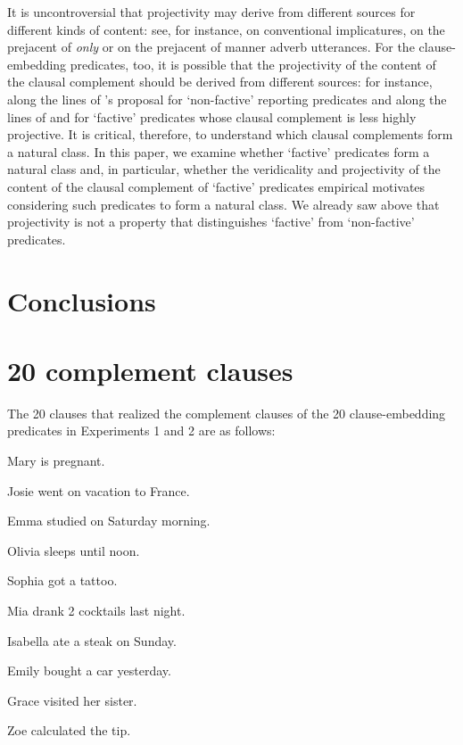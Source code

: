 \documentclass[11pt,fleqn]{article}
\newcommand{\6}{\mbox{$[\hspace*{-.6mm}[$}}
\newcommand{\9}{\mbox{$]\hspace*{-.6mm}]$}}
\newcommand{\citepos}[1]{\citeauthor{#1}'s \citeyear{#1}}
\begin{document}
{\begin{itemize}
It is uncontroversial that projectivity may derive from different sources for different kinds of content: see, for instance, \citealt{potts05} on conventional implicatures, \citealt{beaver-clark08} on the prejacent of {\em only} or \citealt{abrusan2013} on the prejacent of manner adverb utterances.  For the clause-embedding predicates, too, it is possible that the projectivity of the content of the clausal complement should be derived from different sources: for instance, along the lines of \citepos{anand-hacquard2014} proposal for `non-factive' reporting predicates and along the lines of \citealt{abusch10,abrusan2011} and \citealt{romoli2015} for `factive' predicates whose clausal complement is less highly projective. It is critical, therefore, to understand which clausal complements form a natural class. In this paper, we examine whether `factive' predicates form a natural class and, in particular, whether the veridicality and projectivity of the content of the clausal complement of `factive' predicates empirical motivates considering such predicates to form a natural class. We already saw above that projectivity is not a property that distinguishes `factive' from `non-factive' predicates. 

\end{itemize}

\section{Conclusions}\label{s5}

\appendix

\setcounter{table}{0}
\renewcommand{\thetable}{A\arabic{table}}

\setcounter{figure}{0}
\renewcommand{\thefigure}{A\arabic{figure}}

\section{20 complement clauses}\label{a-clauses}

The 20  clauses that realized the complement clauses of the 20 clause-embedding predicates in Experiments 1 and 2 are as follows:

\begin{enumerate}[leftmargin=3ex,itemsep=-2pt]

\begin{multicols}{2}

\item Mary is pregnant.
\item Josie went on vacation to France.
\item Emma studied on Saturday morning.
\item Olivia sleeps until noon.
\item Sophia got a tattoo.
\item Mia drank 2 cocktails last night.
\item Isabella ate a steak on Sunday.
\item  Emily bought a car yesterday.
\item  Grace visited her sister.
\item Zoe calculated the tip.


\end{multicols}
\end{enumerate}}
\end{document}
